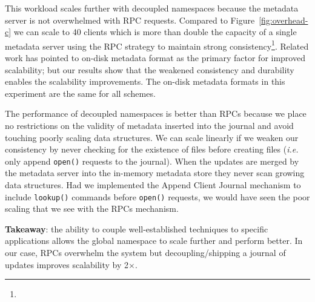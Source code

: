 This workload scales further with decoupled namespaces because the metadata
server is not overwhelmed with RPC requests. Compared to
Figure~\ref{fig:overhead-c} we can scale to 40 clients which is more than
double the capacity of a single metadata server using the RPC strategy to
maintain strong consistency\footnote{}. Related work has pointed
to on-disk metadata format as the primary factor for improved scalability; but
our results show that the weakened consistency and durability enables the
scalability improvements. The on-disk metadata formats in this experiment are
the same for all schemes.

The performance of decoupled namespaces is better than RPCs because we place no
restrictions on the validity of metadata inserted into the journal and avoid
touching poorly scaling data structures. We can scale linearly if we weaken our
consistency by never checking for the existence of files before creating files
({\it i.e.} only append \texttt{open()} requests to the journal).  When the
updates are merged by the metadata server into the in-memory metadata store
they never scan growing data structures.  Had we implemented the Append Client
Journal mechanism to include \texttt{lookup()} commands before \texttt{open()}
requests, we would have seen the poor scaling that we see with the RPCs
mechanism. 


%

\textbf{Takeaway}: the ability to couple well-established techniques to
specific applications allows the global namespace to scale further and perform
better. In our case, RPCs overwhelm the system but decoupling/shipping a
journal of updates improves scalability by 2\(\times\).

